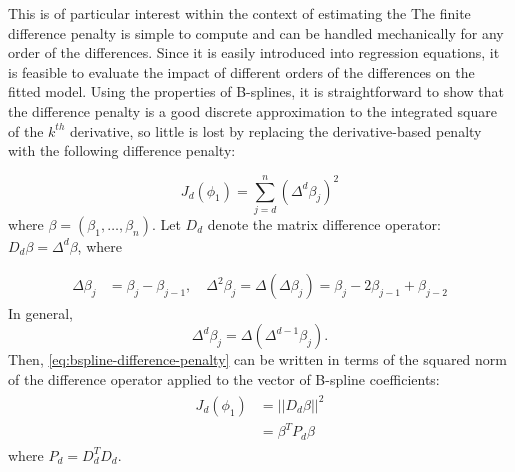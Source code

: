 \documentclass[12pt]{article}
\theoremstyle{definition}
\begin{document}
This is of particular interest within the context of estimating the The finite difference penalty is simple to compute and can be handled mechanically for any order of the differences. Since it is easily introduced into regression equations, it is feasible to evaluate the impact of different orders of the differences on the fitted model.  Using the properties of B-splines, it is straightforward to show that the difference penalty is a good discrete approximation to the integrated square of the $k^{th}$ derivative, so little is lost by replacing the derivative-based penalty with the following difference penalty:

\begin{equation} \label{eq:bspline-difference-penalty}
J_d\left( \phi_1 \right) = \sum_{j=d}^n \left(\Delta^d \beta_j\right)^2
\end{equation} 
\noindent
where $\beta = \left( \beta_1,\dots,\beta_n \right)$. Let $D_d$ denote the matrix difference operator: $D_d\beta = \Delta^d \beta$, where

 \begin{align*}
 \Delta \beta_j &= \beta_j - \beta_{j-1}, \quad  \Delta^2 \beta_j = \Delta\left(\Delta \beta_j\right) = \beta_j - 2\beta_{j-1} + \beta_{j-2}
 \end{align*}
\noindent 
In general,
\begin{equation*}
\Delta^d \beta_j = \Delta\left(\Delta^{d-1} \beta_j \right).
\end{equation*} 
\noindent
Then, \ref{eq:bspline-difference-penalty} can be written in terms of the squared norm of the difference operator applied to the vector of B-spline coefficients:
\begin{align} 
\begin{split} \label{eq:bspline-difference-penalty-vector-form}
J_d\left( \phi_1 \right) &= \vert \vert D_d\beta \vert \vert^2 \\
&= \beta^T P_d \beta
\end{split}
\end{align}
\noindent
where $P_d = D_d^T D_d$.
\end{document}
